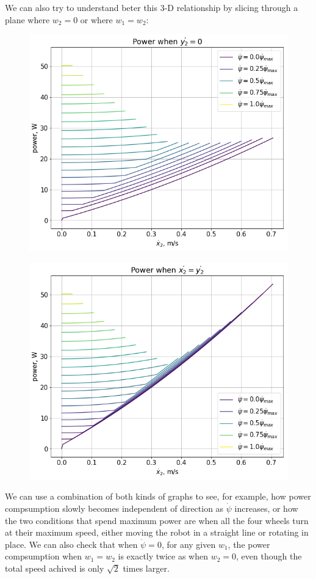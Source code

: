 \documentclass[12pt]{article}
\begin{document}
We can also try to understand beter this 3-D relationship by slicing through a plane where $w_2=0$ or where $w_1 = w_2$:
\begin{figure}[h]
	\centering
	\begin{minipage}{.5\textwidth}
		\centering
		\includegraphics[width=.9\linewidth]{power_map_y_0}
		\label{fig:power_y_0}
	\end{minipage}%
	\begin{minipage}{.5\textwidth}
		\centering
		\includegraphics[width=.9\linewidth]{power_map_y_x}
		\label{fig:power_y_x}
	\end{minipage}
\end{figure}

We can use a combination of both kinds of graphs to see, for example, how power compsumption slowly becomes independent of direction as $\dot{\psi}$ increases, or how the two conditions that spend maximum power are when all the four wheels turn at their maximum speed, either moving the robot in a straight line or rotating in place. We can also check that when $\dot{\psi} = 0$, for any given $w_1$, the power compsumption when $w_1 = w_2$ is exactly twice as when $w_2=0$, even though the total speed achived is only $\sqrt{2}$ times larger.
\end{document}
